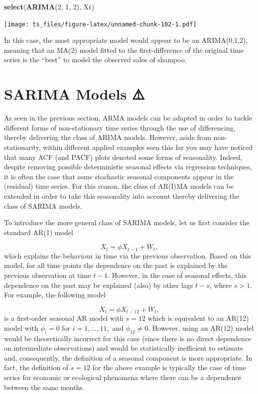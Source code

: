 \documentclass[]{book}
\newenvironment{Shaded}{\begin{snugshade}}{\end{snugshade}}
\newcommand{\KeywordTok}[1]{\textcolor[rgb]{0.13,0.29,0.53}{\textbf{#1}}}
\newcommand{\DecValTok}[1]{\textcolor[rgb]{0.00,0.00,0.81}{#1}}
\newcommand{\NormalTok}[1]{#1}
\theoremstyle{definition}
\theoremstyle{definition}
\theoremstyle{definition}
\theoremstyle{remark}
\begin{document}
\begin{Shaded}
\begin{Highlighting}[]
\KeywordTok{select}\NormalTok{(}\KeywordTok{ARIMA}\NormalTok{(}\DecValTok{2}\NormalTok{, }\DecValTok{1}\NormalTok{, }\DecValTok{2}\NormalTok{), Xt)}
\end{Highlighting}
\end{Shaded}

\texttt{[image: ts\_files/figure-latex/unnamed-chunk-102-1.pdf]}

In this case, the most appropriate model would appear to be an
ARIMA(0,1,2), meaning that an MA(2) model fitted to the first-difference
of the original time series is the ``best'' to model the observed sales
of shampoo.

\section{SARIMA Models ⚠️}\label{sarima-models}

As seen in the previous section, ARMA models can be adapted in order to
tackle different forms of non-stationary time series through the use of
differencing, thereby delivering the class of ARIMA models. However,
aside from non-stationarity, within different applied examples seen this
far you may have noticed that many ACF (and PACF) plots denoted some
forms of seasonality. Indeed, despite removing possible deterministic
seasonal effects via regression techniques, it is often the case that
some stochastic seasonal components appear in the (residual) time
series. For this reason, the class of AR(I)MA models can be extended in
order to take this seasonality into account thereby delivering the class
of SARIMA models.

To introduce the more general class of SARIMA models, let us first
consider the standard AR(1) model

\[X_t = \phi X_{t-1} + W_t,\] which explains the behaviour in time via
the previous observation. Based on this model, for all time points the
dependence on the past is explained by the previous observation at time
\(t-1\). However, in the case of seasonal effects, this dependence on
the past may be explained (also) by other lags \(t-s\), where \(s > 1\).
For example, the following model

\[X_t = \phi X_{t-12} + W_t,\] is a first-order seasonal AR model with
\(s = 12\) which is equivalent to an AR(12) model with \(\phi_i = 0\)
for \(i = 1,...,11,\) and \(\phi_{12} \neq 0\). However, using an AR(12)
model would be theoretically incorrect for this case (since there is no
direct dependence on intermediate observations) and would be
statistically inefficient to estimate and, consequently, the definition
of a seasonal component is more appropriate. In fact, the definition of
\(s = 12\) for the above example is typically the case of time series
for economic or ecological phenomena where there can be a dependence
between the same months.
\end{document}
